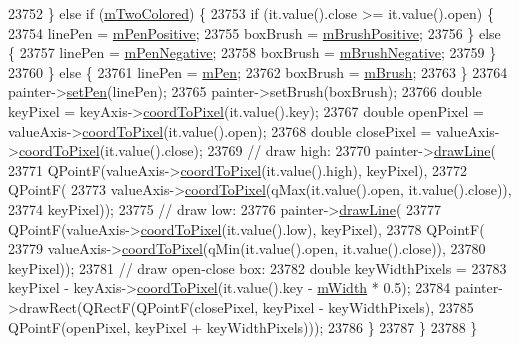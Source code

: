\begin{DoxyCode}
23752       \} \textcolor{keywordflow}{else} \textcolor{keywordflow}{if} (\hyperlink{class_q_c_p_financial_a6afe919190b884d9bac026cefcc8c0a8}{mTwoColored}) \{
23753         \textcolor{keywordflow}{if} (it.value().close >= it.value().open) \{
23754           linePen = \hyperlink{class_q_c_p_financial_aa6599186f417ba615caebb3f6c762bd8}{mPenPositive};
23755           boxBrush = \hyperlink{class_q_c_p_financial_ab7e6eed16260a2f88ca6bd940dffea79}{mBrushPositive};
23756         \} \textcolor{keywordflow}{else} \{
23757           linePen = \hyperlink{class_q_c_p_financial_a263fbfefde2cc19c8d4024a8319c2bbb}{mPenNegative};
23758           boxBrush = \hyperlink{class_q_c_p_financial_acb0e31874b7a1deb56bd42e8ab3e68f2}{mBrushNegative};
23759         \}
23760       \} \textcolor{keywordflow}{else} \{
23761         linePen = \hyperlink{class_q_c_p_abstract_plottable_a67bc0622fd1b9fa14e54c14922dcec66}{mPen};
23762         boxBrush = \hyperlink{class_q_c_p_abstract_plottable_a33f00674c0161c13315ab9da0895418e}{mBrush};
23763       \}
23764       painter->\hyperlink{class_q_c_p_painter_af9c7a4cd1791403901f8c5b82a150195}{setPen}(linePen);
23765       painter->setBrush(boxBrush);
23766       \textcolor{keywordtype}{double} keyPixel = keyAxis->\hyperlink{class_q_c_p_axis_a985ae693b842fb0422b4390fe36d299a}{coordToPixel}(it.value().key);
23767       \textcolor{keywordtype}{double} openPixel = valueAxis->\hyperlink{class_q_c_p_axis_a985ae693b842fb0422b4390fe36d299a}{coordToPixel}(it.value().open);
23768       \textcolor{keywordtype}{double} closePixel = valueAxis->\hyperlink{class_q_c_p_axis_a985ae693b842fb0422b4390fe36d299a}{coordToPixel}(it.value().close);
23769       \textcolor{comment}{// draw high:}
23770       painter->\hyperlink{class_q_c_p_painter_a0b4b1b9bd495e182c731774dc800e6e0}{drawLine}(
23771           QPointF(valueAxis->\hyperlink{class_q_c_p_axis_a985ae693b842fb0422b4390fe36d299a}{coordToPixel}(it.value().high), keyPixel),
23772           QPointF(
23773               valueAxis->\hyperlink{class_q_c_p_axis_a985ae693b842fb0422b4390fe36d299a}{coordToPixel}(qMax(it.value().open, it.value().close)),
23774               keyPixel));
23775       \textcolor{comment}{// draw low:}
23776       painter->\hyperlink{class_q_c_p_painter_a0b4b1b9bd495e182c731774dc800e6e0}{drawLine}(
23777           QPointF(valueAxis->\hyperlink{class_q_c_p_axis_a985ae693b842fb0422b4390fe36d299a}{coordToPixel}(it.value().low), keyPixel),
23778           QPointF(
23779               valueAxis->\hyperlink{class_q_c_p_axis_a985ae693b842fb0422b4390fe36d299a}{coordToPixel}(qMin(it.value().open, it.value().close)),
23780               keyPixel));
23781       \textcolor{comment}{// draw open-close box:}
23782       \textcolor{keywordtype}{double} keyWidthPixels =
23783           keyPixel - keyAxis->\hyperlink{class_q_c_p_axis_a985ae693b842fb0422b4390fe36d299a}{coordToPixel}(it.value().key - \hyperlink{class_q_c_p_financial_af630e5eb8485146b9c777e63fd1cf993}{mWidth} * 0.5);
23784       painter->drawRect(QRectF(QPointF(closePixel, keyPixel - keyWidthPixels),
23785                                QPointF(openPixel, keyPixel + keyWidthPixels)));
23786     \}
23787   \}
23788 \}
\end{DoxyCode}



